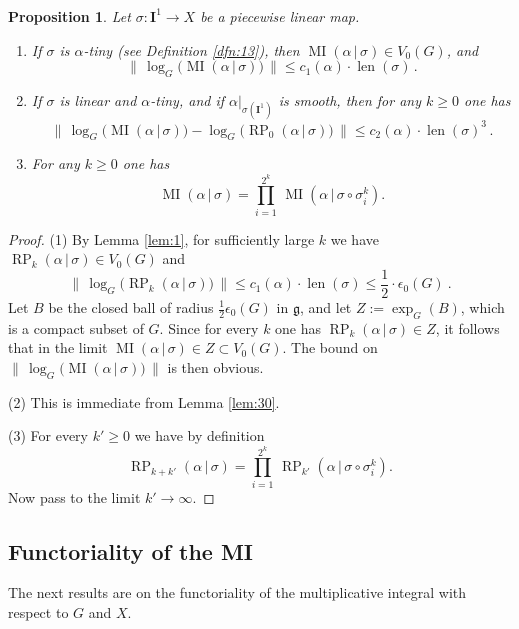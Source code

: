\documentclass[10pt, a4paper]{amsart}
\newtheorem{prop}[equation]{Proposition}
\theoremstyle{definition}
\numberwithin{equation}{section}
\newcommand{\opn}{\operatorname}
\newcommand{\mfrak}[1]{\mathfrak{#1}}
\newcommand{\mbf}[1]{\mathbf{#1}}
\newcommand{\smfrac}[2]{{\textstyle \frac{#1}{#2}}}
\newcommand{\tup}[1]{\textup{#1}}
\newcommand{\Norm}[1]{\bigl\lVert\, #1 \, \bigr\rVert}
\renewcommand{\vert}{\, | \,}
\newcommand{\g}{\mfrak{g}}
\begin{document}
\begin{prop} \label{prop:5}
Let $\sigma : \mbf{I}^{1} \to X$ be a piecewise linear map.
\begin{enumerate}
\item If $\sigma$ is $\alpha$-tiny \tup{(}see Definition \tup{\ref{dfn:13})},
then 
$\opn{MI}(\alpha \vert \sigma) \in V_0(G)$, and 
\[ \Norm{ \opn{log}_G \bigl( \opn{MI}(\alpha \vert \sigma) \bigr) }
\leq c_1(\alpha) \cdot  \opn{len}(\sigma) \, . \]

\item If $\sigma$ is linear and $\alpha$-tiny, and if 
$\alpha|_{\sigma(\mbf{I}^{1})}$ is smooth, then for any $k \geq 0$ one has
\[ \Norm{ \opn{log}_G \bigl( \opn{MI}(\alpha \vert \sigma) \bigr) -
\opn{log}_G \bigl( \opn{RP}_0(\alpha \vert \sigma) \bigr) }
\leq c_2(\alpha) \cdot \opn{len}(\sigma)^3 \, . \]

\item For any $k \geq 0$ one has
\[ \opn{MI}(\alpha \vert \sigma)  =
\prod_{i = 1}^{2^k}  \, \opn{MI}(\alpha \vert \sigma \circ \sigma^k_i ) . \]
\end{enumerate}
\end{prop}

\begin{proof}
(1) By Lemma \ref{lem:1}, for sufficiently large $k$ we have
$\opn{RP}_k(\alpha \vert \sigma) \in V_0(G)$ and 
\[ \Norm{ \opn{log}_G \bigl( \opn{RP}_k(\alpha \vert \sigma) \bigr) } 
\leq c_1(\alpha) \cdot \opn{len}(\sigma) \leq 
\smfrac{1}{2} \cdot \epsilon_0(G) \ . \]
Let $B$ be the closed ball of radius $\smfrac{1}{2} \epsilon_0(G)$ in
$\g$, and let $Z := \opn{exp}_G(B)$, which is a compact subset of $G$.
Since for every $k$ one has
$\opn{RP}_k(\alpha \vert \sigma) \in Z$, it follows that in the limit
$\opn{MI}(\alpha \vert \sigma) \in Z \subset V_0(G)$.
The bound on 
$\Norm{ \opn{log}_G \bigl( \opn{MI}(\alpha \vert \sigma) \bigr) }$
is then obvious.

\medskip \noindent
(2) This is immediate from Lemma \ref{lem:30}.

\medskip \noindent
(3) For every $k' \geq 0$ we have by definition
\[ \opn{RP}_{k + k'}(\alpha \vert \sigma) = 
\prod_{i = 1}^{2^k}  \, \opn{RP}_{k'}(\alpha \vert \sigma \circ \sigma^k_i ) .
\]
Now pass to the limit $k' \to  \infty$.
\end{proof}

\subsection{Functoriality of the MI}
The next results are on the functoriality of the multiplicative integral with
respect to $G$ and $X$. 
\end{document}
